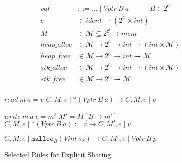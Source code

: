 \documentclass{article}
\begin{document}
\begin{figure}

  \begin{minipage}{0.45\textwidth}
    \[\begin{aligned}
    \mathit{val} & ::= \ldots \mid \mathit{Vptr} ~ B ~ a \hspace{3em} B \in 2^{\mathcal{C}} \\
    e & \in \mathit{ident} \rightharpoonup (2^{\mathcal{C}} \times \mathit{int}) \\
    M & \in \mathcal{M} \subseteq 2^{\mathcal{C}} \rightarrow \mathit{mem} \\
    \mathit{heap\_alloc} & \in \mathcal{M} \rightarrow 2^{\mathcal{C}} \rightarrow
    \mathit{int} \rightharpoonup (\mathit{int} \times \mathcal{M}) \\
    \mathit{heap\_free} & \in \mathcal{M} \rightarrow 2^{\mathcal{C}} \rightarrow
    \mathit{int} \rightharpoonup \mathcal{M} \\
    \mathit{stk\_alloc} & \in \mathcal{M} \rightarrow 2^{\mathcal{C}} \rightarrow
    \mathit{int} \rightharpoonup (\mathit{int} \times \mathcal{M}) \\
    \mathit{stk\_free} & \in \mathcal{M} \rightarrow 2^{\mathcal{C}}
    \rightharpoonup \mathcal{M} \\
    \end{aligned}\]
  \end{minipage}
  \begin{minipage}{0.55\textwidth}
                {\(\mathit{read} ~ m ~ a = v\)}
                {\(C,M,e \mid *(\mathit{Vptr} ~ B ~ a)
                  \longrightarrow C,M,e \mid v\)}

                  {\(\mathit{write} ~ m ~ a ~ v = m'\)}
                  {\(M' = M[B \mapsto m']\)}
                  {\(C,M,e \mid *(\mathit{Vptr} ~ B ~ a) := v
                    \longrightarrow C,M',e \mid v\)}

             {\(C,M,e \mid \mathtt{malloc}_B(\mathit{Vint} ~ sz)
               \longrightarrow C,M',e \mid \mathit{Vptr} ~ B ~ p\)}

  \end{minipage}

  \caption{Selected Rules for Explicit Sharing}
  \label{fig:powerset}
\end{figure}
\end{document}
